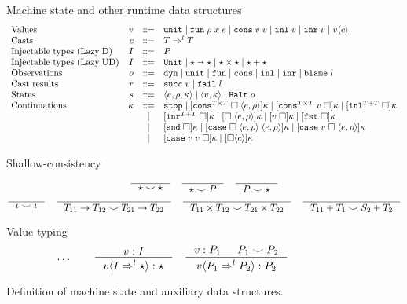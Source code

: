 \documentclass[acmsmall,review,anonymous]{acmart}\settopmatter{printfolios=true,printccs=false,printacmref=false}
\newcommand{\stxrule}[3]{\text{#2} & #1 & ::= & #3\\}
\newcommand{\stxrulecont}[1]{& & | & #1 \\}
\newcommand{\plus}[0]{+}
\newcommand{\lazyUD}{Lazy\;UD}
\newcommand{\lazyD}{Lazy\;D}
\newcommand{\sOOinspect}[3]{\langle#1,#2,#3\rangle}
\newcommand{\sOOreturn}[2]{\langle#1,#2\rangle}
\newcommand{\sOOhalt}[1]{\mathtt{Halt} \; #1}
\newcommand{\TOOdyn}[0]{\star}
\newcommand{\POOunit}[0]{\mathtt{Unit}}
\newcommand{\POOfun}[2]{#1 \shortrightarrow #2}
\newcommand{\POOprod}[2]{#1 \times #2}
\newcommand{\POOsum}[2]{#1 \plus #2}
\newcommand{\cOOcast}[3]{#1 \Rightarrow^{#2} #3}
\newcommand{\oOOinj}{\mathtt{dyn}}
\newcommand{\oOOsole}{\mathtt{unit}}
\newcommand{\oOOfun}{\mathtt{fun}}
\newcommand{\oOOcons}{\mathtt{cons}}
\newcommand{\oOOinl}{\mathtt{inl}}
\newcommand{\oOOinr}{\mathtt{inr}}
\newcommand{\oOOblame}[1]{\mathtt{blame} \; #1}
\newcommand{\vOOcast}[2]{#1\langle#2\rangle}
\newcommand{\vOOfun}[3]{\mathtt{fun} \; #1 \; #2 \; #3}
\newcommand{\vOOtt}[0]{\mathtt{unit}}
\newcommand{\vOOcons}[2]{\mathtt{cons}\;#1\;#2}
\newcommand{\vOOinl}[1]{\mathtt{inl}\;#1}
\newcommand{\vOOinr}[1]{\mathtt{inr}\;#1}
\newcommand{\rOOsucc}[1]{\mathtt{succ}\;#1}
\newcommand{\rOOfail}[1]{\mathtt{fail}\;#1}
\newcommand{\kOOmt}[0]{\mathtt{stop}}
\newcommand{\kOOconsI}[5]{
	[\mathtt{cons}^{\POOprod{#1}{#2}} \; \square \; \langle#3,#4\rangle ]#5}
\newcommand{\kOOconsII}[4]{
	[\mathtt{cons}^{\POOprod{#1}{#2}} \; #3 \; \square]#4}
\newcommand{\kOOinl}[3]{[\mathtt{inl}^{\POOsum{#1}{#2}}\; \square]#3}
\newcommand{\kOOinr}[3]{[\mathtt{inr}^{\POOsum{#1}{#2}}\; \square]#3}
\newcommand{\kOOappI}[3]{
  [\square \; \langle#1,#2\rangle]#3
}
\newcommand{\kOOappII}[2]{
  [#1 \; \square]#2}
\newcommand{\kOOcar}[1]{[\mathtt{fst} \; \square]#1}
\newcommand{\kOOcdr}[1]{[\mathtt{snd} \; \square]#1}
\newcommand{\kOOcaseI}[4]{
  [\mathtt{case} \; \square \; \langle#1,#3\rangle \; \langle#2,#3\rangle ]#4}
\newcommand{\kOOcaseII}[4]{
  [\mathtt{case} \; #1 \; \square \; \langle#2,#3\rangle ]#4}
\newcommand{\kOOcaseIII}[3]{
  [\mathtt{case} \; #1 \; #2 \; \square]#3}
\newcommand{\kOOcast}[2]{
  [\square \langle #1 \rangle]#2}
\begin{document}
\begin{figure}
  Machine state and other runtime data structures
  \[
  \begin{array}{lrcl}
  \stxrule{v}{Values}{
    \vOOtt{} \mid
    \vOOfun{\rho}{x}{e} \mid
    \vOOcons{v}{v} \mid
    \vOOinl{v} \mid
    \vOOinr{v} \mid   
    \vOOcast{v}{c}
  }
  \stxrule{c}{Casts}{
    \cOOcast{T}{l}{T}
  }
  \stxrule{I}{Injectable types (\lazyD)}{
    P
  }
  \stxrule{I}{Injectable types (\lazyUD)}{
    \POOunit \mid
    \POOfun{\star}{\star} \mid
    \star \times \star \mid
    \star + \star
  }
  \stxrule{o}{Observations}{
    \oOOinj \mid
    \oOOsole \mid
    \oOOfun \mid
    \oOOcons \mid
    \oOOinl \mid
    \oOOinr \mid
    \oOOblame{l}
  }
  \stxrule{r}{Cast results}{
    \rOOsucc{v} \mid
    \rOOfail{l}
  }
  \stxrule{s}{States}{
    \sOOinspect{e}{\rho}{\kappa} \mid{}
    \sOOreturn{v}{\kappa} \mid{}
    \sOOhalt{o}
  }
  \stxrule{\kappa}{Continuations}{
    \kOOmt \mid
    \kOOconsI{T}{T}{e}{\rho}{\kappa} \mid
    \kOOconsII{T}{T}{v}{\kappa} \mid
    \kOOinl{T}{T}{\kappa}
  }
  \stxrulecont{
    \kOOinr{T}{T}{\kappa} \mid
    \kOOappI{e}{\rho}{\kappa} \mid
    \kOOappII{v}{\kappa} \mid
    \kOOcar{\kappa}
  }
  \stxrulecont{ 
    \kOOcdr{\kappa}\mid
    \kOOcaseI{e}{e}{\rho}{\kappa}\mid
    \kOOcaseII{v}{e}{\rho}{\kappa}
  }
  \stxrulecont{
    \kOOcaseIII{v}{v}{\kappa} \mid
    \kOOcast{c}{\kappa}
  }
  \end{array}
  \]

        Shallow-consistency
  \begin{gather*}
  \inference{}{
    \star \smile \star
  } \quad
  \inference{}{
    \star \smile P
  } \quad
  \inference{}{
    P \smile \star
  } \\
  \inference{}{
    \iota \smile \iota
  } \quad
  \inference{}{
    T_{11} \rightarrow T_{12} \smile T_{21} \rightarrow T_{22}
  } \quad
  \inference{}{
    T_{11} \times T_{12} \smile T_{21} \times T_{22}
  } \quad
  \inference{}{
  T_{11} \plus T_1 \smile S_2 \plus T_2
  }
  \end{gather*}
  
  Value typing 
  \begin{gather*}
  \dots \qquad
  \inference{
    v : I
  }{
    \vOOcast{v}{\cOOcast{I}{l}{\TOOdyn}} : \TOOdyn
  }
  \quad
  \inference{
    v : P_1 &
    P_1 \smile P_2
  }{
    \vOOcast{v}{\cOOcast{P_1}{l}{P_2}} : P_2
  }
  \end{gather*}
        \caption{Definition of machine state and auxiliary data
          structures.}
        \label{fig:state}
\end{figure}
\end{document}
